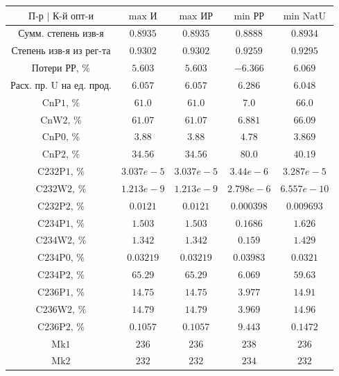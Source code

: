 \begin{table}
    \begin{tabular}{ccccc}
        $\text{П-р | К-й опт-и}$ & $\text{max И}$ & $\text{max ИР}$ & $\text{min РР}$ & $\text{min NatU}$\\ \hline
        $\text{Сумм. степень изв-я}$ & $0.8935$ & $0.8935$ & $0.8888$ & $0.8934$\\ \hline
        $\text{Степень изв-я из рег-та}$ & $0.9302$ & $0.9302$ & $0.9259$ & $0.9295$\\ \hline
        $\text{Потери РР, \%}$ & $5.603$ & $5.603$ & $-6.366$ & $6.069$\\ \hline
        $\text{Расх. пр. U на ед. прод.}$ & $6.057$ & $6.057$ & $6.286$ & $6.048$\\ \hline
        $\text{CnP1, \%}$ & $61.0$ & $61.0$ & $7.0$ & $66.0$\\ \hline
        $\text{CnW2, \%}$ & $61.07$ & $61.07$ & $6.881$ & $66.09$\\ \hline
        $\text{CnP0, \%}$ & $3.88$ & $3.88$ & $4.78$ & $3.869$\\ \hline
        $\text{CnP2, \%}$ & $34.56$ & $34.56$ & $80.0$ & $40.19$\\ \hline
        $\text{C232P1, \%}$ & $3.037e-5$ & $3.037e-5$ & $3.44e-6$ & $3.287e-5$\\ \hline
        $\text{C232W2, \%}$ & $1.213e-9$ & $1.213e-9$ & $2.798e-6$ & $6.557e-10$\\ \hline
        $\text{C232P2, \%}$ & $0.0121$ & $0.0121$ & $0.000398$ & $0.009693$\\ \hline
        $\text{C234P1, \%}$ & $1.503$ & $1.503$ & $0.1686$ & $1.626$\\ \hline
        $\text{C234W2, \%}$ & $1.342$ & $1.342$ & $0.159$ & $1.429$\\ \hline
        $\text{C234P0, \%}$ & $0.03219$ & $0.03219$ & $0.03983$ & $0.0321$\\ \hline
        $\text{C234P2, \%}$ & $65.29$ & $65.29$ & $6.069$ & $59.63$\\ \hline
        $\text{C236P1, \%}$ & $14.75$ & $14.75$ & $3.977$ & $14.91$\\ \hline
        $\text{C236W2, \%}$ & $14.79$ & $14.79$ & $3.969$ & $14.96$\\ \hline
        $\text{C236P2, \%}$ & $0.1057$ & $0.1057$ & $9.443$ & $0.1472$\\ \hline
        $\text{Mk1}$ & $236$ & $236$ & $238$ & $236$\\ \hline
        $\text{Mk2}$ & $232$ & $232$ & $234$ & $232$\\ \hline

\end{tabular}
\end{table}
